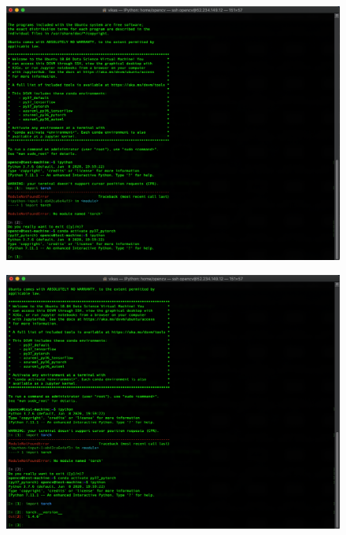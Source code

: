 \begin{figure}[H]
\begin{center} 
\includegraphics[scale=0.40]{figures/ssh11}
\end{center}
\end{figure}

\begin{figure}[H]
\begin{center} 
\includegraphics[scale=0.40]{figures/ssh12}
\end{center}
\end{figure}


